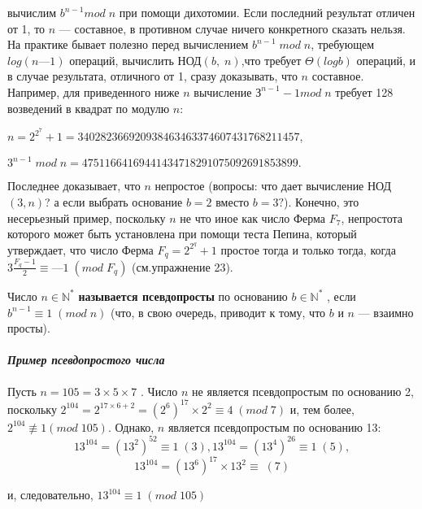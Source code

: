   	
  	\noindent
  	вычислим $b^{n-1} mod\;n$ при помощи дихотомии. Если последний результат отличен от 1, то $n$ — составное, в противном случае ничего конкретного сказать нельзя. На практике бывает полезно перед вычислением $b^{n-1}\;mod\;n$, требующем $log(n— 1)$ операций, вычислить НОД$(b,\;n)$,что требует $\varTheta(logb)$ операций, и в случае результата, отличного от 1,
  	сразу доказывать, что $n$ составное. Например, для приведенного ниже $n$ вычисление $З^{n-1}- 1 mod\;n$ требует 128 возведений в квадрат по модулю $n$:
  	\begin{center}
  		$n=2^{2^{7}}+1=340 282 366 920 938 463 463 374 607 431768 211457$,
  		
  		$3^{n-1}\;mod\;n=47 511664169 441434 718 291075 092 691853 899.$
  	\end{center}
  	\noindent
  	Последнее доказывает, что $n$ непростое (вопросы: что дает вычисление НОД$(3,n)$? а если выбрать основание $b = 2$ вместо $b = 3?$). Конечно,  это несерьезный пример, поскольку $n$ не что иное как число Ферма  $F_7$, непростота которого может быть установлена при помощи теста  Пепина, который утверждает, что число Ферма $F_q=2^{2^{q}}+1$ простое  тогда и только тогда, когда $3\frac{F_q-1}{2}\equiv —1\;(mod\;F_q)$ (см.упражнение 23).
  	\begin{determ}
  	\noindent
  	
  	Число $n \in \mathbb N^{*}$ {\bf называется псевдопросты}  по основанию $b \in \mathbb N^{*}$ ,	если $b^{n-1} \equiv 1\;(mod\;n)$ (что, в свою очередь, приводит к тому, что $b$ и $n$ — взаимно просты).
  	\end{determ}
  	\paragraph{{\it Пример псевдопростого числа}}
  	\noindent
  	
  	Пусть $n=105 = 3\times5\times7$ . Число $n$ не является псевдопростым по основанию 2, поскольку $2^104 = 2^{17\times6+2}= (2^6)^{17} \times 2^2 \equiv 4\;(mod\;7)$
  	и, тем более, $2^{104} \not\equiv 1 (mod\;105)$. Однако, $n$ является псевдопростым по основанию 13:
  	\begin{equation}
  	13^{104}=(13^2)^{52}\equiv 1\;(3), 13^104=(13^4)^{26} \equiv 1\;(5),
  	\end{equation}
  	\begin{equation}
  	 13^{104} = (13^6)^{17}\times 13^2 \equiv \;(7)
  	\end{equation}

  	
  	и, следовательно, $13^{104} \equiv 1\;(mod\;105)$
  	
